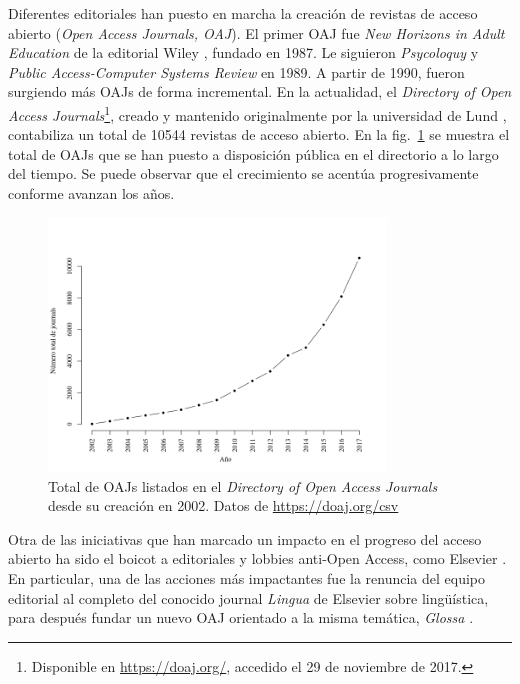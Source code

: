 Diferentes editoriales han puesto en marcha la creación de revistas de acceso abierto (\textit{Open Access Journals, OAJ}). El primer OAJ fue \textit{New Horizons in Adult Education} de la editorial Wiley \cite{earlyoaj}, fundado en 1987. Le siguieron \textit{Psycoloquy} y \textit{Public Access-Computer Systems Review} en 1989. A partir de 1990, fueron surgiendo más OAJs de forma incremental. En la actualidad, el \textit{Directory of Open Access Journals}\footnote{Disponible en \url{https://doaj.org/}, accedido el 29 de noviembre de 2017.}, creado y mantenido originalmente por la universidad de Lund \cite{nordic}, contabiliza un total de 10544 revistas de acceso abierto. En la fig.~\ref{fig:doaj} se muestra el total de OAJs que se han puesto a disposición pública en el directorio a lo largo del tiempo. Se puede observar que el crecimiento se acentúa progresivamente conforme avanzan los años.

\begin{figure}[htbp]
  \centering
  \includegraphics[width=0.8\textwidth]{doaj_years.png}
  \caption{\label{fig:doaj}Total de OAJs listados en el \textit{Directory of Open Access Journals} desde su creación en 2002. Datos de \url{https://doaj.org/csv}}

\end{figure}

\label{sec:boicot}
Otra de las iniciativas que han marcado un impacto en el progreso del acceso abierto ha sido el boicot a editoriales y lobbies anti-Open Access, como Elsevier \cite{costknowledge}. En particular, una de las acciones más impactantes fue la renuncia del equipo editorial al completo del conocido journal \textit{Lingua} de Elsevier sobre lingüística, para después fundar un nuevo OAJ orientado a la misma temática, \textit{Glossa} \cite{linguaglossa}.

